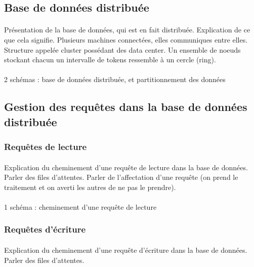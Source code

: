 \documentclass[12pt]{article}
\begin{document}

\subsection{Base de données distribuée}
\paragraph{} Présentation de la base de données, qui est en fait distribuée. Explication de ce que cela signifie. Plusieurs machines connectées, elles communiques entre elles. Structure appelée cluster possédant des data center. Un ensemble de noeuds stockant chacun un intervalle de tokens ressemble à un cercle (ring).

\paragraph{} 2 schémas : base de données distribuée, et partitionnement des données

\subsection{Gestion des requêtes dans la base de données distribuée}
\subsubsection{Requêtes de lecture}
\paragraph{} Explication du cheminement d'une requête de lecture dans la base de données. Parler des files d'attentes. Parler de l'affectation d'une requête (on prend le traitement et on averti les autres de ne pas le prendre).

\paragraph{} 1 schéma : cheminement d'une requête de lecture

\subsubsection{Requêtes d'écriture}
\paragraph{} Explication du cheminement d'une requête d'écriture dans la base de données. Parler des files d'attentes.
\end{document}
